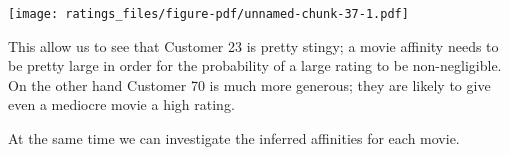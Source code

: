 \documentclass[
  letterpaper,
  DIV=11,
  numbers=noendperiod]{scrartcl}
\newenvironment{Shaded}{\begin{snugshade}}{\end{snugshade}}
\newcommand{\AttributeTok}[1]{\textcolor[rgb]{0.40,0.45,0.13}{#1}}
\newcommand{\ConstantTok}[1]{\textcolor[rgb]{0.56,0.35,0.01}{#1}}
\newcommand{\ControlFlowTok}[1]{\textcolor[rgb]{0.00,0.23,0.31}{#1}}
\newcommand{\DecValTok}[1]{\textcolor[rgb]{0.68,0.00,0.00}{#1}}
\newcommand{\FloatTok}[1]{\textcolor[rgb]{0.68,0.00,0.00}{#1}}
\newcommand{\FunctionTok}[1]{\textcolor[rgb]{0.28,0.35,0.67}{#1}}
\newcommand{\NormalTok}[1]{\textcolor[rgb]{0.00,0.23,0.31}{#1}}
\newcommand{\OtherTok}[1]{\textcolor[rgb]{0.00,0.23,0.31}{#1}}
\newcommand{\SpecialCharTok}[1]{\textcolor[rgb]{0.37,0.37,0.37}{#1}}
\newcommand{\StringTok}[1]{\textcolor[rgb]{0.13,0.47,0.30}{#1}}
\begin{document}
\begin{Shaded}
\end{Shaded}

\texttt{[image: ratings\_files/figure-pdf/unnamed-chunk-37-1.pdf]}

This allow us to see that Customer 23 is pretty stingy; a movie affinity
needs to be pretty large in order for the probability of a large rating
to be non-negligible. On the other hand Customer 70 is much more
generous; they are likely to give even a mediocre movie a high rating.

At the same time we can investigate the inferred affinities for each
movie.
\end{document}
